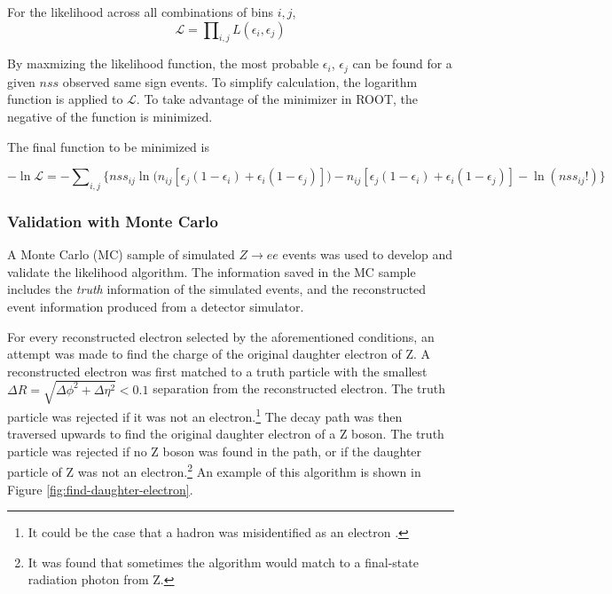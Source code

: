 For the likelihood across all combinations of bins $i,j$,
\begin{equation}
\mathcal{L} = \prod\nolimits_{i,j} L(\epsilon_i, \epsilon_j)
\end{equation}

By maxmizing the likelihood function, the most probable $\epsilon_i$, $\epsilon_j$ can be found for a given $nss$ observed same sign events. To simplify calculation, the logarithm function is applied to $\mathcal{L}$. To take advantage of the minimizer in ROOT, the negative of the function is minimized. 

The final function to be minimized is 

\begin{equation}
-\ln \mathcal{L} = -\sum\nolimits_{i,j} \Big\{ {nss}_{ij} \ln\big(n_{ij}[\epsilon_j(1-\epsilon_i) + \epsilon_i(1-\epsilon_j)]\big) - n_{ij}[\epsilon_j(1-\epsilon_i) + \epsilon_i(1-\epsilon_j)] - \ln (nss_{ij}!) \Big\}
\end{equation} 

\subsubsection*{Validation with Monte Carlo}
A Monte Carlo (MC) sample of simulated $Z \rightarrow ee$ events was used to develop and validate the likelihood algorithm. The information saved in the MC sample includes the \textit{truth} information of the simulated events, and the reconstructed event information produced from a detector simulator. 


For every reconstructed electron selected by the aforementioned conditions, an attempt was made to find the charge of the original daughter electron of Z. A reconstructed electron was first matched to a truth particle with the smallest $\Delta R = \sqrt{\Delta \phi^2 + \Delta \eta^2} < 0.1$ separation from the reconstructed electron. The truth particle was rejected if it was not an electron.\footnote{It could be the case that a hadron was misidentified as an electron \cite{ElectronReco2011}.} The decay path was then traversed upwards to find the original daughter electron of a Z boson. The truth particle was rejected if no Z boson was found in the path, or if the daughter particle of Z was not an electron.\footnote{It was found that sometimes the algorithm would match to a final-state radiation photon from Z.} An example of this algorithm is shown in Figure \ref{fig:find-daughter-electron}.

